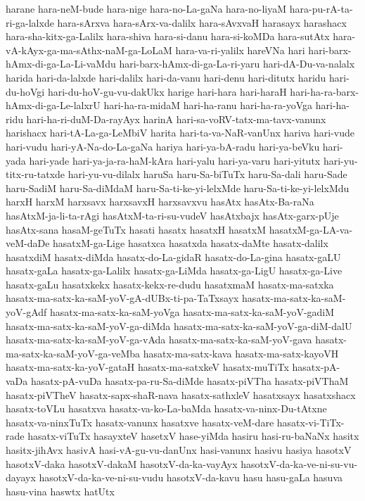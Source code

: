 {harane
hara-neM-bude
hara-nige
hara-no-La-gaNa
hara-no-liyaM
hara-pu-rA-ta-ri-ga-lalxde
hara-sArxva
hara-sArx-va-dalilx
hara-sAvxvaH
harasayx
harashacx
hara-sha-kitx-ga-Lalilx
hara-shiva
hara-si-danu
hara-si-koMDa
hara-sutAtx
hara-vA-kAyx-ga-ma-sAthx-naM-ga-LoLaM
hara-va-ri-yalilx
hareVNa
hari
hari-barx-hAmx-di-ga-La-Li-vaMdu
hari-barx-hAmx-di-ga-La-ri-yaru
hari-dA-Du-va-nalalx
harida
hari-da-lalxde
hari-dalilx
hari-da-vanu
hari-denu
hari-ditutx
haridu
hari-du-hoVgi
hari-du-hoV-gu-vu-dakUkx
harige
hari-hara
hari-haraH
hari-ha-ra-barx-hAmx-di-ga-Le-lalxrU
hari-ha-ra-midaM
hari-ha-ranu
hari-ha-ra-yoVga
hari-ha-ridu
hari-ha-ri-duM-Da-rayAyx
harinA
hari-sa-voRV-tatx-ma-tavx-vanunx
harishacx
hari-tA-La-ga-LeMbiV
harita
hari-ta-va-NaR-vanUnx
hariva
hari-vude
hari-vudu
hari-yA-Na-do-La-gaNa
hariya
hari-ya-bA-radu
hari-ya-beVku
hari-yada
hari-yade
hari-ya-ja-ra-haM-kAra
hari-yalu
hari-ya-varu
hari-yitutx
hari-yu-titx-ru-tatxde
hari-yu-vu-dilalx
haruSa
haru-Sa-biTuTx
haru-Sa-dali
haru-Sade
haru-SadiM
haru-Sa-diMdaM
haru-Sa-ti-ke-yi-lelxMde
haru-Sa-ti-ke-yi-lelxMdu
harxH
harxM
harxsavx
harxsavxH
harxsavxvu
hasAtx
hasAtx-Ba-raNa
hasAtxM-ja-li-ta-rAgi
hasAtxM-ta-ri-su-vudeV
hasAtxbajx
hasAtx-garx-pUje
hasAtx-sana
hasaM-geTuTx
hasati
hasatx
hasatxH
hasatxM
hasatxM-ga-LA-va-veM-daDe
hasatxM-ga-Lige
hasatxca
hasatxda
hasatx-daMte
hasatx-dalilx
hasatxdiM
hasatx-diMda
hasatx-do-La-gidaR
hasatx-do-La-gina
hasatx-gaLU
hasatx-gaLa
hasatx-ga-Lalilx
hasatx-ga-LiMda
hasatx-ga-LigU
hasatx-ga-Live
hasatx-gaLu
hasatxkekx
hasatx-kekx-re-dudu
hasatxmaM
hasatx-ma-satxka
hasatx-ma-satx-ka-saM-yoV-gA-dUBx-ti-pa-TaTxsayx
hasatx-ma-satx-ka-saM-yoV-gAdf
hasatx-ma-satx-ka-saM-yoVga
hasatx-ma-satx-ka-saM-yoV-gadiM
hasatx-ma-satx-ka-saM-yoV-ga-diMda
hasatx-ma-satx-ka-saM-yoV-ga-diM-dalU
hasatx-ma-satx-ka-saM-yoV-ga-vAda
hasatx-ma-satx-ka-saM-yoV-gava
hasatx-ma-satx-ka-saM-yoV-ga-veMba
hasatx-ma-satx-kava
hasatx-ma-satx-kayoVH
hasatx-ma-satx-ka-yoV-gataH
hasatx-ma-satxkeV
hasatx-muTiTx
hasatx-pA-vaDa
hasatx-pA-vuDa
hasatx-pa-ru-Sa-diMde
hasatx-piVTha
hasatx-piVThaM
hasatx-piVTheV
hasatx-sapx-shaR-nava
hasatx-sathxleV
hasatxsayx
hasatxshacx
hasatx-toVLu
hasatxva
hasatx-va-ko-La-baMda
hasatx-va-ninx-Du-tAtxne
hasatx-va-ninxTuTx
hasatx-vanunx
hasatxve
hasatx-veM-dare
hasatx-vi-TiTx-rade
hasatx-viTuTx
hasayxteV
hasetxV
hase-yiMda
hasiru
hasi-ru-baNaNx
hasitx
hasitx-jihAvx
hasivA
hasi-vA-gu-vu-danUnx
hasi-vanunx
hasivu
hasiya
hasotxV
hasotxV-daka
hasotxV-dakaM
hasotxV-da-ka-vayAyx
hasotxV-da-ka-ve-ni-su-vu-dayayx
hasotxV-da-ka-ve-ni-su-vudu
hasotxV-da-kavu
hasu
hasu-gaLa
hasuva
hasu-vina
haswtx
hatUtx
}
